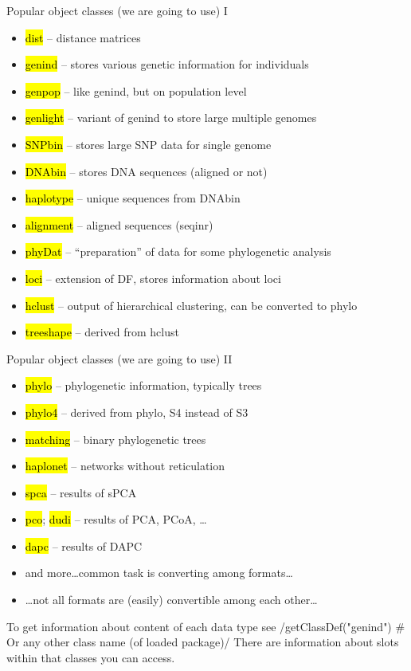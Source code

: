 \documentclass[compress, ucs, xelatex, 11pt, xcolor=svgnames,
  hyperref={
    bookmarks=true,
    unicode=true,
    colorlinks=true,
    pdftitle={Molecular data in R},
    plainpages=false,
    pdfauthor={Vojtech Zeisek},
    pdfsubject={Course about phylogeny and evolution in R},
    pdfcreator={XeLaTeX},
    pdfkeywords={R, evolution, phylogeny, molecular data},
    linkcolor=Tomato,
    anchorcolor=SaddleBrown,
    citecolor=Goldenrod,
    filecolor=DarkMagenta,
    menucolor=Sienna,
    urlcolor=DarkTurquoise,
    pdftex},
  url={hyphens, lowtilde} %
  ]{beamer}
\renewcommand{\texttt}[1]{\hl{\ttfamily #1}}
\begin{document}
\begin{frame}{Popular object classes (we are going to use) I}
\begin{itemize}
 \item \texttt{dist} -- distance matrices
 \item \texttt{genind} -- stores various genetic information for individuals
 \item \texttt{genpop} -- like genind, but on population level
 \item \texttt{genlight} -- variant of genind to store large multiple genomes
 \item \texttt{SNPbin} -- stores large SNP data for single genome
 \item \texttt{DNAbin} -- stores DNA sequences (aligned or not)
 \item \texttt{haplotype} -- unique sequences from DNAbin
 \item \texttt{alignment} -- aligned sequences (seqinr)
 \item \texttt{phyDat} -- ``preparation'' of data for some phylogenetic analysis
 \item \texttt{loci} -- extension of DF, stores information about loci
 \item \texttt{hclust} -- output of hierarchical clustering, can be converted to phylo
 \item \texttt{treeshape} -- derived from hclust
\end{itemize}
\end{frame}

\begin{frame}[fragile]{Popular object classes (we are going to use) II}
\begin{itemize}
 \item \texttt{phylo} -- phylogenetic information, typically trees
 \item \texttt{phylo4} -- derived from phylo, S4 instead of S3
 \item \texttt{matching} -- binary phylogenetic trees
 \item \texttt{haplonet} -- networks without reticulation
 \item \texttt{spca} -- results of sPCA
 \item \texttt{pco}; \texttt{dudi} -- results of PCA, PCoA, \ldots
 \item \texttt{dapc} -- results of DAPC
 \item and more\ldots common task is converting among formats\ldots
 \item \ldots not all formats are (easily) convertible among each other\ldots
\end{itemize}
To get information about content of each data type see
\splus/getClassDef("genind") # Or any other class name (of loaded package)/
There are information about slots within that classes you can access.
\end{frame}
\end{document}
